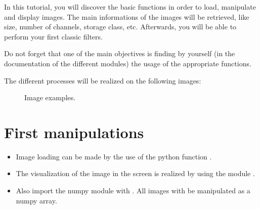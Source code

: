 \def\difficulty{1}


\begin{note}
In this tutorial, you will discover the basic functions in order to load, manipulate and  display images. The main informations of the images will be retrieved, like size, number of channels, storage class, etc. Afterwards, you will be able to perform your first classic filters.

Do not forget that one of the main objectives is finding by yourself (in the documentation of the different modules) the usage of the appropriate functions. 
\end{note}

\noindent The different processes will be realized on the following images:

\vspace*{-8pt}
\begin{figure}[htbp]
\centering\caption{Image examples.}
\hfill
{}
\hfill
{}
\vspace*{-10pt}
\end{figure}

\vspace*{-15pt}


\section{First manipulations}

\begin{pcomment}
\begin{premark}
\begin{itemize}\item Image loading can be made by the use of the python function .
 \item 
The visualization of the image in the screen is realized by using the module .
\item Also import the numpy module with . All images with be manipulated as a numpy array.
\end{itemize}



\end{premark}
\end{pcomment}


